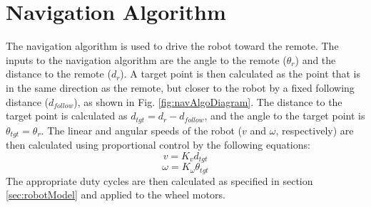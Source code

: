 \section{Navigation Algorithm}
The navigation algorithm is used to drive the robot toward the remote. The inputs to the navigation algorithm are the angle to the remote ($\theta_r$) and the distance to the remote ($d_r$). A target point is then calculated as the point that is in the same direction as the remote, but closer to the robot by a fixed following distance ($d_{follow}$), as shown in Fig. \ref{fig:navAlgoDiagram}. The distance to the target point is calculated as $d_{tgt} = d_r - d_{follow}$, and the angle to the target point is $\theta_{tgt} = \theta_r$. The linear and angular speeds of the robot ($v$ and $\omega$, respectively) are then calculated using proportional control by the following equations:
$$v = K_vd_{tgt}$$
$$\omega = K_\omega\theta_{tgt}$$
The appropriate duty cycles are then calculated as specified in section \ref{sec:robotModel} and applied to the wheel motors.
